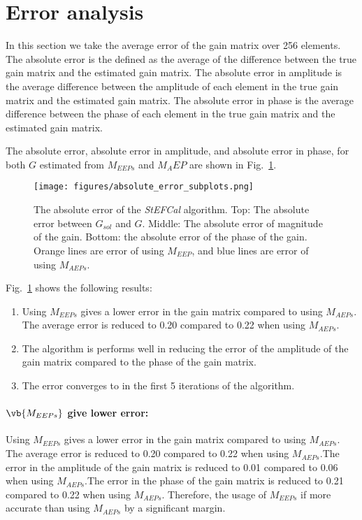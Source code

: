 \documentclass[10pt,a4paper,twocolumn]{paper}
\begin{document}
\section{Error analysis}

In this section we take the average error of the gain matrix over 256 elements. The absolute error is the defined as the average of the difference between the true gain matrix and the estimated gain matrix. The absolute error in amplitude is the average difference between the amplitude of each element in the true gain matrix and the estimated gain matrix. The absolute error in phase is the average difference between the phase of each element in the true gain matrix and the estimated gain matrix.

The absolute error, absolute error in amplitude, and absolute error in phase, for both $G$ estimated from $M_{EEPs}$ and $M_AEP$ are shown in Fig.~\ref{fig:absolute_error_subplots}. 

\begin{figure}[H]
    \centering
    \texttt{[image: figures/absolute\_error\_subplots.png]}
    \caption{The absolute error of the \textit{StEFCal} algorithm. Top: The absolute error between $G_{sol}$ and $G$. Middle: The absolute error of magnitude of the gain. Bottom: the absolute error of the phase of the gain. Orange lines are error of using $M_{EEP}$, and blue lines are error of using $M_{AEPs}$.}
    \label{fig:absolute_error_subplots}
\end{figure}

Fig.~\ref{fig:absolute_error_subplots} shows the following results:

\begin{enumerate}
    \item Using $M_{EEPs}$ gives a lower error in the gain matrix compared to using $M_{AEPs}$. The average error is reduced to 0.20 compared to 0.22 when using $M_{AEPs}$.
    \item The algorithm is performs well in reducing the error of the amplitude of the gain matrix compared to the phase of the gain matrix.
    \item The error converges to in the first 5 iterations of the algorithm.
\end{enumerate}

\paragraph*{$\vb{{M}_{EEPs}}$ give lower error:}Using $M_{EEPs}$ gives a lower error in the gain matrix compared to using $M_{AEPs}$. The average error is reduced to 0.20 compared to 0.22 when using $M_{AEPs}$.The error in the amplitude of the gain matrix is reduced to 0.01 compared to 0.06 when using $M_{AEPs}$.The error in the phase of the gain matrix is reduced to 0.21 compared to 0.22 when using $M_{AEPs}.$
Therefore, the usage of $M_{EEPs}$ if more accurate than using $M_{AEPs}$ by a significant margin.
\end{document}
